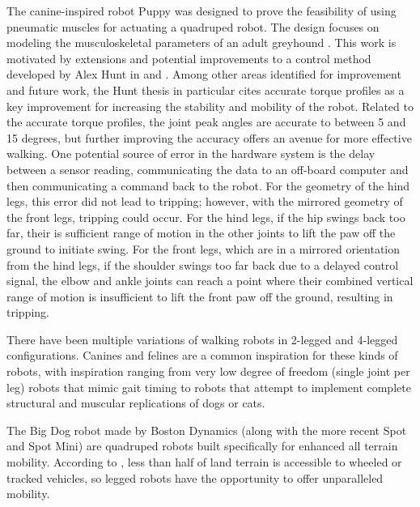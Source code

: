 
The canine-inspired robot Puppy was designed to prove the feasibility of using
pneumatic muscles for actuating a quadruped robot. The design focuses on 
modeling the musculoskeletal parameters of an adult greyhound 
\cite{PuppyDesign}. This work is motivated by extensions and potential
improvements to a control method developed by Alex Hunt in
\cite{HuntPhDThesis} and \cite{HuntHindLegWalking}. Among other areas identified
for improvement and future work, the Hunt thesis in particular cites accurate torque
profiles as a key improvement for increasing the stability and mobility of the
robot. Related to the accurate torque profiles, the joint peak angles are
accurate to between 5 and 15 degrees, but further improving the accuracy offers
an avenue for more effective walking. One potential source of error in the
hardware system is the delay between a sensor reading, communicating the data to
an off-board computer and then communicating a command back to the robot. For the geometry of the hind legs, this error did not lead to tripping; however, with the mirrored geometry of the front legs, tripping could occur. For the hind legs, if the hip swings back too far, their is sufficient range of motion in the other joints to lift the paw off the ground to initiate swing. For the front legs, which are in a mirrored orientation from the hind legs, if the shoulder swings too far back due to a delayed control signal, the elbow and ankle joints can reach a point where their combined vertical range of motion is insufficient to lift the front paw off the ground, resulting in tripping.


There have been multiple variations of walking robots in 2-legged and 4-legged
configurations. Canines and felines are a common inspiration for these kinds of
robots, with inspiration ranging from very low degree of freedom (single joint
per leg) robots that mimic gait timing to robots that attempt to implement
complete structural and muscular replications of dogs or cats.


The Big Dog robot made by Boston Dynamics (along with the more recent Spot and
Spot Mini) are quadruped robots built specifically for enhanced all terrain
mobility. According to \cite{BigDog}, less than half of land terrain is
accessible to wheeled or tracked vehicles, so legged robots have the opportunity
to offer unparalleled mobility.

